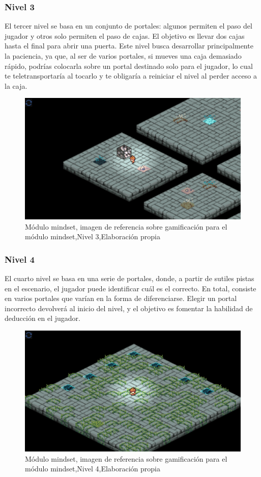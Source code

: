 \subsubsection{Nivel 3}
El tercer nivel se basa en un conjunto de portales: algunos permiten el paso del jugador y otros solo permiten el paso de cajas. El objetivo es llevar dos cajas hasta el final para abrir una puerta. Este nivel busca desarrollar principalmente la paciencia, ya que, al ser de varios portales, si mueves una caja demasiado rápido, podrías colocarla sobre un portal destinado solo para el jugador, lo cual te teletransportaría al tocarlo y te obligaría a reiniciar el nivel al perder acceso a la caja.

\begin{figure}[H]
  \centering
  \includegraphics[width=0.7\linewidth]{Imagenes/Nivel3.png}
  \caption{Módulo mindset, imagen de referencia sobre gamificación para el módulo mindset,Nivel 3,Elaboración propia}
  \label{fig:imagen1mindset}
\end{figure}
\subsubsection{Nivel 4}
El cuarto nivel se basa en una serie de portales, donde, a partir de sutiles pistas en el escenario, el jugador puede identificar cuál es el correcto. En total, consiste en varios portales que varían en la forma de diferenciarse. Elegir un portal incorrecto devolverá al inicio del nivel, y el objetivo es fomentar la habilidad de deducción en el jugador.

\begin{figure}[H]
  \centering
  \includegraphics[width=0.7\linewidth]{Imagenes/Nivel4.png}
  \caption{Módulo mindset, imagen de referencia sobre gamificación para el módulo mindset,Nivel 4,Elaboración propia}
  \label{fig:imagen1mindset}
\end{figure}

